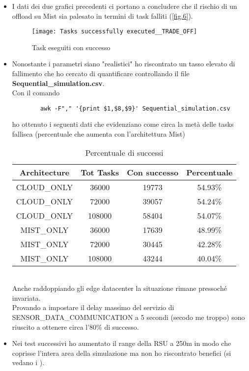 \documentclass[12pt, a4paper]{report} %
\begin{document}
\begin{itemize}
	\item I dati dei due grafici precedenti ci portano a concludere che il rischio di un offload su Mist sia palesato in termini di task falliti (\autoref{fig.6}).
	\begin{figure}[!ht]
		\caption{Task eseguiti con successo}
		\texttt{[image: Tasks successfully executed\_\_TRADE\_OFF]}
		\centering
		\label{fig.6}
	\end{figure}
	\FloatBarrier
	\item Nonostante i parametri siano "realistici" ho riscontrato un tasso elevato di fallimento che ho cercato di quantificare controllando il file \textbf{Sequential\_simulation.csv}. \\
	Con il comando
	\begin{verbatim}
		awk -F"," '{print $1,$8,$9}' Sequential_simulation.csv
	\end{verbatim}
	ho ottenuto i seguenti dati che evidenziano come circa la metà delle tasks fallisca (percentuale che aumenta con l'architettura Mist)
	\begin{table}[h!]
	\begin{center}
	\begin{tabular}{| c | c | c || c ||} %
		\hline
		Architecture & Tot Tasks & Con successo & Percentuale\\ [1ex] 
		\hline
		\hline
		CLOUD\_ONLY & 36000 & 19773 & 54.93\%\\
		\hline
		CLOUD\_ONLY & 72000 & 39057 & 54.24\%\\
		\hline
		CLOUD\_ONLY & 108000 & 58404 & 54.07\%\\
		\hline
		MIST\_ONLY & 36000 & 17639 & 48.99\%\\
		\hline
		MIST\_ONLY & 72000 & 30445 & 42.28\%\\
		\hline
		MIST\_ONLY & 108000 & 43244 & 40.04\%\\ 
		\hline
	\end{tabular}
	\caption{Percentuale di successi}
	\label{successi}
	\end{center}
	\end{table}\\
	Anche raddoppiando gli edge datacenter la situazione rimane pressoché invariata.\\
	Provando a impostare il delay massimo del servizio di\\
	SENSOR\_DATA\_COMMUNICATION a 5 secondi (secodo me troppo) sono riuscito a ottenere circa l'80\% di successo.
	\item Nei test successivi ho aumentato il range della RSU a 250m in modo che coprisse l'intera area della simulazione ma non ho riscontrato benefici (si vedano i ).
\end{itemize}
\end{document}
